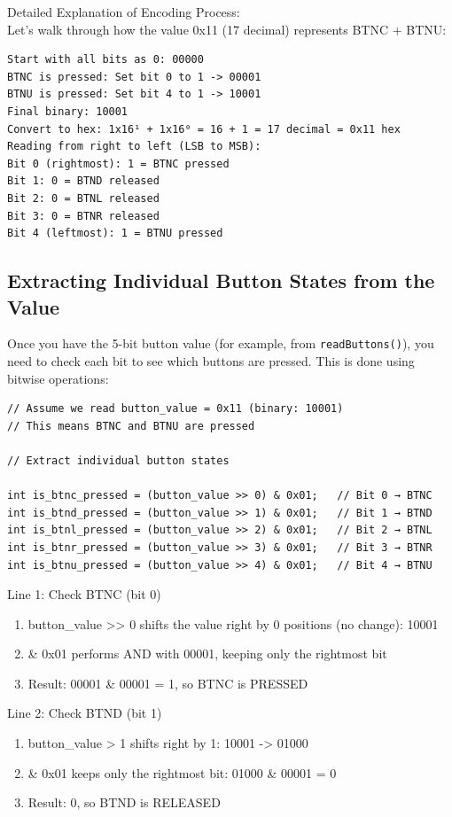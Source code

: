 Detailed Explanation of Encoding Process:\\
Let's walk through how the value 0x11 (17 decimal) represents BTNC + BTNU:\\

\begin{verbatim}
Start with all bits as 0: 00000
BTNC is pressed: Set bit 0 to 1 -> 00001
BTNU is pressed: Set bit 4 to 1 -> 10001
Final binary: 10001
Convert to hex: 1x16¹ + 1x16⁰ = 16 + 1 = 17 decimal = 0x11 hex
Reading from right to left (LSB to MSB):
Bit 0 (rightmost): 1 = BTNC pressed 
Bit 1: 0 = BTND released
Bit 2: 0 = BTNL released
Bit 3: 0 = BTNR released
Bit 4 (leftmost): 1 = BTNU pressed 
\end{verbatim}

\subsection{Extracting Individual Button States from the Value}
Once you have the 5-bit button value (for example, from \texttt{readButtons()}), you need to check each bit to see which buttons are pressed. This is done using bitwise operations:
\begin{verbatim}
// Assume we read button_value = 0x11 (binary: 10001)
// This means BTNC and BTNU are pressed

// Extract individual button states

int is_btnc_pressed = (button_value >> 0) & 0x01;   // Bit 0 → BTNC
int is_btnd_pressed = (button_value >> 1) & 0x01;   // Bit 1 → BTND
int is_btnl_pressed = (button_value >> 2) & 0x01;   // Bit 2 → BTNL
int is_btnr_pressed = (button_value >> 3) & 0x01;   // Bit 3 → BTNR
int is_btnu_pressed = (button_value >> 4) & 0x01;   // Bit 4 → BTNU
\end{verbatim}
Line 1: Check BTNC (bit 0)

\begin{enumerate}
\item button\_value >> 0 shifts the value right by 0 positions (no change): 10001
\item \& 0x01 performs AND with 00001, keeping only the rightmost bit
\item Result: 00001 \& 00001 = 1, so BTNC is PRESSED
\end{enumerate}

Line 2: Check BTND (bit 1)

\begin{enumerate}
\item button\_value \>> 1 shifts right by 1: 10001 -> 01000
\item \& 0x01 keeps only the rightmost bit: 01000 \& 00001 = 0
\item Result: 0, so BTND is RELEASED
\end{enumerate}

